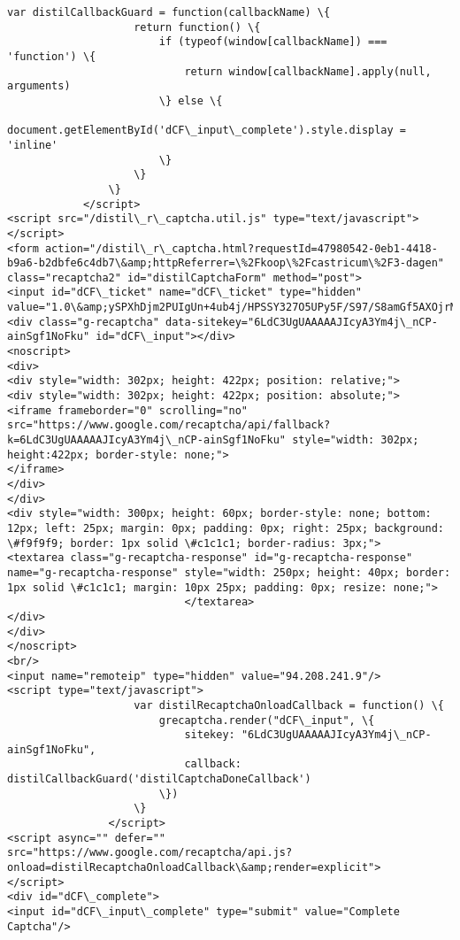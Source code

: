 \documentclass[11pt]{article}
\begin{document}
\begin{Verbatim}[commandchars=\\\{\}]
                var distilCallbackGuard = function(callbackName) \{
                    return function() \{
                        if (typeof(window[callbackName]) === 'function') \{
                            return window[callbackName].apply(null, arguments)
                        \} else \{
                            document.getElementById('dCF\_input\_complete').style.display = 'inline'
                        \}
                    \}
                \}
            </script>
<script src="/distil\_r\_captcha.util.js" type="text/javascript"></script>
<form action="/distil\_r\_captcha.html?requestId=47980542-0eb1-4418-b9a6-b2dbfe6c4db7\&amp;httpReferrer=\%2Fkoop\%2Fcastricum\%2F3-dagen" class="recaptcha2" id="distilCaptchaForm" method="post">
<input id="dCF\_ticket" name="dCF\_ticket" type="hidden" value="1.0\&amp;ySPXhDjm2PUIgUn+4ub4j/HPSSY327O5UPy5F/S97/S8amGf5AXOjrMw0ALxkQD7G5VT/Xok0qzPYB/ycntMNbuEe6WDQYLyRgqFiD0h0dReloGYO2qZU+z2f2tmuvjRKNkzX1axYcsGkRRB1hXuZDlThrknHJDr6dbOuzfjyt4="/>
<div class="g-recaptcha" data-sitekey="6LdC3UgUAAAAAJIcyA3Ym4j\_nCP-ainSgf1NoFku" id="dCF\_input"></div>
<noscript>
<div>
<div style="width: 302px; height: 422px; position: relative;">
<div style="width: 302px; height: 422px; position: absolute;">
<iframe frameborder="0" scrolling="no" src="https://www.google.com/recaptcha/api/fallback?k=6LdC3UgUAAAAAJIcyA3Ym4j\_nCP-ainSgf1NoFku" style="width: 302px; height:422px; border-style: none;">
</iframe>
</div>
</div>
<div style="width: 300px; height: 60px; border-style: none; bottom: 12px; left: 25px; margin: 0px; padding: 0px; right: 25px; background: \#f9f9f9; border: 1px solid \#c1c1c1; border-radius: 3px;">
<textarea class="g-recaptcha-response" id="g-recaptcha-response" name="g-recaptcha-response" style="width: 250px; height: 40px; border: 1px solid \#c1c1c1; margin: 10px 25px; padding: 0px; resize: none;">
                            </textarea>
</div>
</div>
</noscript>
<br/>
<input name="remoteip" type="hidden" value="94.208.241.9"/>
<script type="text/javascript">
                    var distilRecaptchaOnloadCallback = function() \{
                        grecaptcha.render("dCF\_input", \{
                            sitekey: "6LdC3UgUAAAAAJIcyA3Ym4j\_nCP-ainSgf1NoFku",
                            callback: distilCallbackGuard('distilCaptchaDoneCallback')
                        \})
                    \}
                </script>
<script async="" defer="" src="https://www.google.com/recaptcha/api.js?onload=distilRecaptchaOnloadCallback\&amp;render=explicit">
</script>
<div id="dCF\_complete">
<input id="dCF\_input\_complete" type="submit" value="Complete Captcha"/>

\end{Verbatim}
\end{document}

